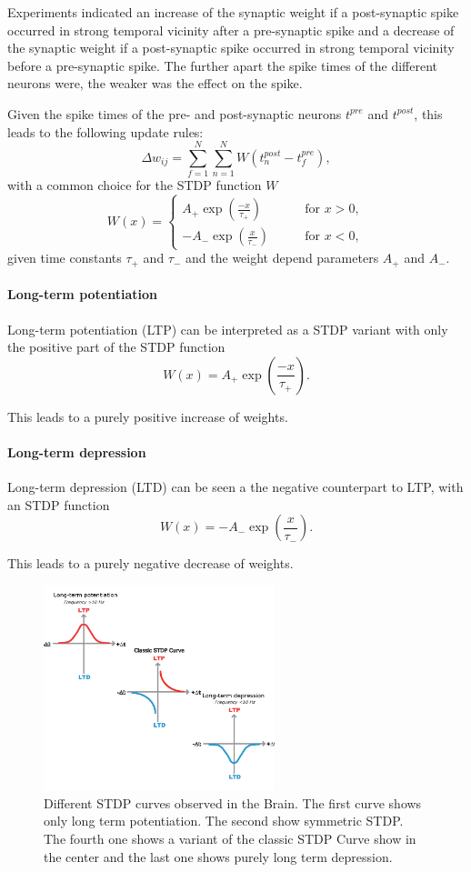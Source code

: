 Experiments indicated an increase of the synaptic weight if a post-synaptic spike occurred in strong temporal vicinity after a pre-synaptic spike and a decrease of the synaptic weight if a post-synaptic spike occurred in strong temporal vicinity before a pre-synaptic spike.
The further apart the spike times of the different neurons were, the weaker was the effect on the spike.

Given the spike times of the pre- and post-synaptic neurons $t^{pre}$ and $t^{post}$, this leads to the following update rules:
\[
\Delta w_{ij} = \sum_{f=1}^N \sum_{n=1}^N W(t^{post}_n - t^{pre}_f),
\]
with a common choice for the STDP function $W$
\[
W(x) =
\begin{cases}
A_+ \exp(\frac{-x}{\tau_+}) \quad \quad &\text{for  } x > 0,  \\
-A_- \exp(\frac{x}{\tau_-}) \quad \quad &\text{for  } x < 0,
\end{cases}
\]
given time constants $\tau_+$ and $\tau_-$ and the weight depend parameters $A_+$ and $A_-$.
     

\paragraph{Long-term potentiation}
 
Long-term potentiation (LTP) can be interpreted as a STDP variant with only the positive part of the STDP function
\[
W(x) =  A_+ \exp(\frac{-x}{\tau_+}).
\]

This leads to a purely positive increase of weights.

\paragraph{Long-term depression}

Long-term depression (LTD) can be seen a the negative counterpart to LTP, with an STDP function
\[
W(x) =  -A_- \exp(\frac{x}{\tau_-}).
\]

This leads to a purely negative decrease of weights.

\begin{figure}
	\centering
    	\includegraphics[width=0.6\textwidth]{imgs/stdp_curves.jpg} 
    \caption{Different STDP curves observed in the Brain. The first curve shows only long term potentiation. The second show symmetric STDP. The fourth one shows a variant of the classic STDP Curve show in the center and the last one shows purely long term depression.}
	\label{fig:stdp}
\end{figure}